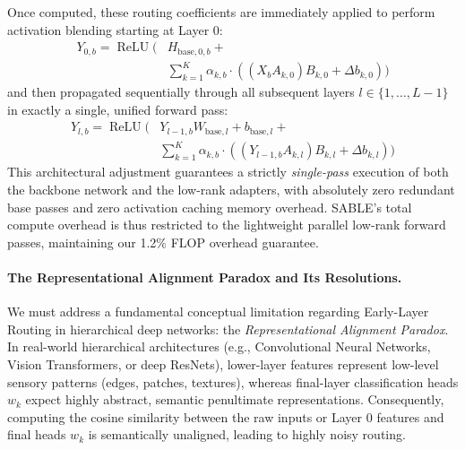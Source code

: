 Once computed, these routing coefficients are immediately applied to perform activation blending starting at Layer 0:
\begin{equation}
\begin{aligned}
Y_{0, b} = \operatorname{ReLU}\Big( &H_{\text{base}, 0, b} + \\
&\sum_{k=1}^K \alpha_{k, b} \cdot \left( (X_b A_{k, 0}) B_{k, 0} + \Delta b_{k, 0} \right) \Big)
\end{aligned}
\label{eq:layer0_blending}
\end{equation}
and then propagated sequentially through all subsequent layers $l \in \{1, \dots, L-1\}$ in exactly a single, unified forward pass:
\begin{equation}
\begin{aligned}
Y_{l, b} = \operatorname{ReLU}\Big( &Y_{l-1, b} W_{\text{base}, l} + b_{\text{base}, l} + \\
&\sum_{k=1}^K \alpha_{k, b} \cdot \left( (Y_{l-1, b} A_{k, l}) B_{k, l} + \Delta b_{k, l} \right) \Big)
\end{aligned}
\label{eq:subsequent_blending}
\end{equation}
This architectural adjustment guarantees a strictly \emph{single-pass} execution of both the backbone network and the low-rank adapters, with absolutely zero redundant base passes and zero activation caching memory overhead. SABLE's total compute overhead is thus restricted to the lightweight parallel low-rank forward passes, maintaining our 1.2\% FLOP overhead guarantee.

\paragraph{The Representational Alignment Paradox and Its Resolutions.} We must address a fundamental conceptual limitation regarding Early-Layer Routing in hierarchical deep networks: the \emph{Representational Alignment Paradox}. In real-world hierarchical architectures (e.g., Convolutional Neural Networks, Vision Transformers, or deep ResNets), lower-layer features represent low-level sensory patterns (edges, patches, textures), whereas final-layer classification heads $w_k$ expect highly abstract, semantic penultimate representations. Consequently, computing the cosine similarity between the raw inputs or Layer 0 features and final heads $w_k$ is semantically unaligned, leading to highly noisy routing.

